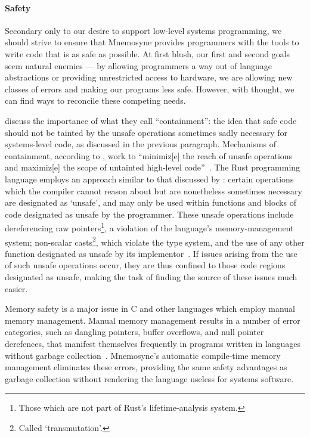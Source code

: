 \paragraph{Safety}

Secondary only to our desire to support low-level systems programming, we should strive to ensure that Mnemosyne provides programmers with the tools to write code that is as safe as possible. At first blush, our first and second goals seem natural enemies --- by allowing programmers a way out of language abstractions or providing unrestricted access to hardware, we are allowing new classes of errors and making our programs less safe. However, with thought, we can find ways to reconcile these competing needs.

\citeauthor{Frampton:2009:DMH:1508293.1508305} discuss the importance of what they call ``containment'': the idea that safe code should not be tainted by the unsafe operations sometimes sadly necessary for systems-level code, as discussed in the previous paragraph. Mechanisms of containment, according to \citeauthor{Frampton:2009:DMH:1508293.1508305}, work to ``minimiz[e] the reach of unsafe operations and maximiz[e] the scope of untainted high-level code''~\cite{Frampton:2009:DMH:1508293.1508305}. The Rust programming language employs an approach similar to that discussed by \citeauthor{Frampton:2009:DMH:1508293.1508305}: certain operations which the compiler cannot reason about but are nonetheless sometimes necessary are designated as `unsafe', and may only be used within functions and blocks of code designated as unsafe by the programmer. These unsafe operations include dereferencing raw pointers\footnote{Those which are not part of Rust's lifetime-analysis system.}, a violation of the language's memory-management system; non-scalar casts\footnote{Called `transmutation'.}, which violate the type system, and the use of any other function designated as unsafe by its implementor~\cite{Matsakis:2014:RL:2663171.2663188, whyrust}. If issues arising from the use of such unsafe operations occur, they are thus confined to those code regions designated as unsafe, making the task of finding the source of these issues much easier.

Memory safety is a major issue in C and other languages which employ manual memory management. Manual memory management results in a number of error categories, such as dangling pointers, buffer overflows, and null pointer derefences, that manifest themselves frequently in programs written in languages without garbage collection~\cite{Shapiro:2006:PLC:1215995.1216004,Ray:2014:LSS:2635868.2635922,Bhattacharya:2011:APL:1985793.1985817,hawblitzel2004low}. Mnemosyne's automatic compile-time memory management eliminates these errors, providing the same safety advantages as garbage collection without rendering the language useless for systems software.

